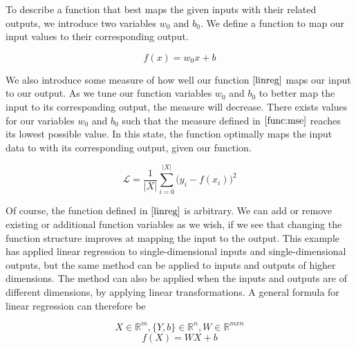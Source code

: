To describe a function that best maps the given inputs with their related outputs, 
we introduce two variables $ w_0 $ and $ b_0 $. We define a function to map our input values to their corresponding output.

\[
        f(x) = w_0x + b \tag{2.1} \label{linreg}
\]

We also introduce some measure of how well our function $ \eqref{linreg} $
maps our input to our output. As we tune our function variables $ w_0 $ and $ b_0 $ to better map the input to its corresponding output,
the measure will decrease. There exists values for our variables $ w_0 $ and $ b_0 $  such that the measure defined in $ \ref{func:mse} $ reaches its lowest possible value.
In this state, the function optimally maps the input data to with its corresponding output, given our function.

\[
    \mathcal{L} = \frac{1}{|X|}\sum_{i = 0}^{|X|} \big(y_i - f(x_i)\big)^2 \tag{2.2} \label{func:mse}
\]

Of course, the function defined in $ \eqref{linreg} $ is arbitrary. 
We can add or remove existing or additional function variables as we wish,
if we see that changing the function structure improves at mapping the input to the output.
This example has applied linear regression to single-dimensional inputs and single-dimensional outputs,
but the same method can be applied to inputs and outputs of higher dimensions.
The method can also be applied when the inputs and outputs are of different dimensions, by applying linear transformations.
A general formula for linear regression can therefore be 



\[
    X \in \mathbb{R}^m, \{Y, b\} \in \mathbb{R}^n, W \in \mathbb{R}^{m x n}
\]
\[
    f(X) = WX + b \tag{2.3} \label{func:linearLayer}
\]
 

